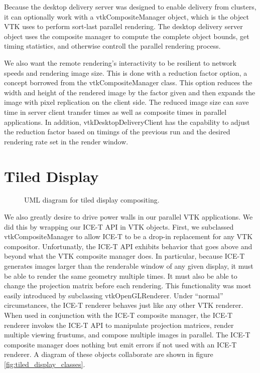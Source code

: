 \documentclass[twocolumn]{article}
\begin{document}
Because the desktop delivery server was designed to enable delivery from
clusters, it can optionally work with a vtkCompositeManager object, which
is the object VTK uses to perform sort-last parallel rendering.  The
desktop delivery server object uses the composite manager to compute the
complete object bounds, get timing statistics, and otherwise controll the
parallel rendering process.

We also want the remote rendering's interactivity to be resilient to
network speeds and rendering image size.  This is done with a reduction
factor option, a concept borrowed from the vtkCompositeManager class.  This
option reduces the width and height of the rendered image by the factor
given and then expands the image with pixel replication on the client side.
The reduced image size can save time in server client transfer times as
well as composite times in parallel applications.  In addition,
vtkDesktopDeliveryClient has the capability to adjust the reduction factor
based on timings of the previous run and the desired rendering rate set in
the render window.


\section{Tiled Display}
\label{sec:tiled_display}

\begin{figure*}
  \caption{UML diagram for tiled display compositing.}
  \label{fig:tiled_display_classes}
\end{figure*}

We also greatly desire to drive power walls in our parallel VTK
applications.  We did this by wrapping our ICE-T API in VTK objects.
First, we subclassed vtkCompositeManager to allow ICE-T to be a drop-in
replacement for any VTK compositor.  Unfortunatly, the ICE-T API exhibits
behavior that goes above and beyond what the VTK composite manager does.
In particular, because ICE-T generates images larger than the renderable
window of any given display, it must be able to render the same geometry
multiple times.  It must also be able to change the projection matrix
before each rendering.  This functionality was most easily introduced by
subclassing vtkOpenGLRenderer.  Under ``normal'' circumstances, the ICE-T
renderer behaves just like any other VTK renderer.  When used in
conjunction with the ICE-T composite manager, the ICE-T renderer invokes
the ICE-T API to manipulate projection matrices, render multiple viewing
frustums, and compose multiple images in parallel.  The ICE-T composite
manager does nothing but emit errors if not used with an ICE-T renderer.  A
diagram of these objects collaborate are shown in figure
\vref{fig:tiled_display_classes}.
\end{document}
